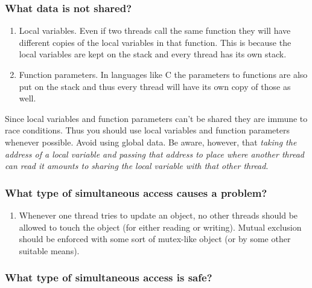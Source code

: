 \subsubsection{What data is not shared?}

\begin{enumerate}

\item Local variables. Even if two threads call the same function they will have different
  copies of the local variables in that function. This is because the local variables are kept
  on the stack and every thread has its own stack.

\item Function parameters. In languages like C the parameters to functions are also put on the
  stack and thus every thread will have its own copy of those as well.

\end{enumerate}

Since local variables and function parameters can't be shared they are immune to race
conditions. Thus you should use local variables and function parameters whenever possible. Avoid
using global data. Be aware, however, that \emph{taking the address of a local variable and
  passing that address to place where another thread can read it amounts to sharing the local
  variable with that other thread}.

\subsubsection{What type of simultaneous access causes a problem?}

\begin{enumerate}

\item Whenever one thread tries to update an object, no other threads should be allowed to touch
  the object (for either reading or writing). Mutual exclusion should be enforced with some sort
  of mutex-like object (or by some other suitable means).
   
\end{enumerate}

\subsubsection{What type of simultaneous access is safe?}

